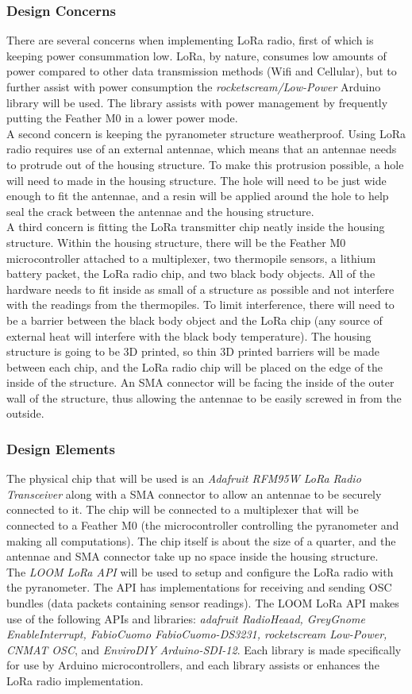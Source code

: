 \documentclass[10pt,draftclsnofoot,onecolumn,letterpaper]{article}
\begin{document}
\subsubsection{Design Concerns}
There are several concerns when implementing LoRa radio, first of which is keeping power consummation low. LoRa, by nature, consumes low amounts of power compared to other data transmission methods (Wifi and Cellular), but to further assist with power consumption the \textit{rocketscream/Low-Power} Arduino library will be used. The library assists with power management by frequently putting the Feather M0 in a lower power mode.\\A second concern is keeping the pyranometer structure weatherproof. Using LoRa radio requires use of an external antennae, which means that an antennae needs to protrude out of the housing structure. To make this protrusion possible, a hole will need to made in the housing structure. The hole will need to be just wide enough to fit the antennae, and a resin will be applied around the hole to help seal the crack between the antennae and the housing structure.\\A third concern is fitting the LoRa transmitter chip neatly inside the housing structure. Within the housing structure, there will be the Feather M0 microcontroller attached to a multiplexer, two thermopile sensors, a lithium battery packet, the LoRa radio chip, and two black body objects. All of the hardware needs to fit inside as small of a structure as possible and not interfere with the readings from the thermopiles. To limit interference, there will need to be a barrier between the black body object and the LoRa chip (any source of external heat will interfere with the black body temperature). The housing structure is going to be 3D printed, so thin 3D printed barriers will be made between each chip, and the LoRa radio chip will be placed on the edge of the inside of the structure. An SMA connector will be facing the inside of the outer wall of the structure, thus allowing the antennae to be easily screwed in from the outside. 
\subsubsection{Design Elements}
The physical chip that will be used is an \textit{Adafruit RFM95W LoRa Radio Transceiver} along with a SMA connector to allow an antennae to be securely connected to it. The chip will be connected to a multiplexer that will be connected to a Feather M0 (the microcontroller controlling the pyranometer and making all computations). The chip itself is about the size of a quarter, and the antennae and SMA connector take up no space inside the housing structure.\\The \textit{LOOM LoRa API} will be used to setup and configure the LoRa radio with the pyranometer. The API has implementations for receiving and sending OSC bundles (data packets containing sensor readings). The LOOM LoRa API makes use of the following APIs and libraries: \textit{adafruit RadioHeaad, GreyGnome EnableInterrupt, FabioCuomo FabioCuomo-DS3231, rocketscream Low-Power, CNMAT OSC}, and \textit{EnviroDIY Arduino-SDI-12}. Each library is made specifically for use by Arduino microcontrollers, and each library assists or enhances the LoRa radio implementation. 
\end{document}
